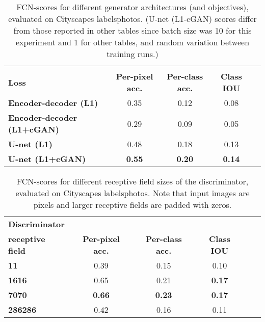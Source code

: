 \documentclass[10pt,twocolumn,letterpaper]{article}
\begin{document}
\begin{table}
\centering
\scalebox{0.75} {
\begin{tabular}{lcccc}
 & & & \\
\textbf{Loss} & \textbf{Per-pixel acc.} & \textbf{Per-class acc.} & \textbf{Class IOU} \\ \hline
\textbf{Encoder-decoder (L1)} & 0.35 & 0.12 & 0.08 \\
\textbf{Encoder-decoder (L1+cGAN)} & 0.29 & 0.09 & 0.05 \\
\textbf{U-net (L1)} & 0.48 & 0.18 & 0.13 \\
\textbf{U-net (L1+cGAN)} & \textbf{0.55} & \textbf{0.20} & \textbf{0.14} \\
\end{tabular} }
\vspace{-0.1in}
\caption {FCN-scores for different generator architectures (and objectives), evaluated on Cityscapes labelsphotos. (U-net (L1-cGAN) scores differ from those reported in other tables since batch size was 10 for this experiment and 1 for other tables, and random variation between training runs.)}
\label{tab:arch_variations}
\vspace{-0.1in}
\end{table}

\begin{table}
\centering
\scalebox{0.75} {
\begin{tabular}{lccccc}
\textbf{Discriminator} & & & \\
\textbf{receptive field} & \textbf{Per-pixel acc.} & \textbf{Per-class acc.} & \textbf{Class IOU} \\ \hline
\textbf{11} & 0.39 & 0.15 & 0.10 \\
\textbf{1616} & 0.65 & 0.21 & \textbf{0.17}  \\
\textbf{7070} & \textbf{0.66} & \textbf{0.23} & \textbf{0.17}  \\
\textbf{286286} & 0.42 & 0.16 & 0.11 \\
\end{tabular} }
\vspace{-0.1in}
\caption {FCN-scores for different receptive field sizes of the discriminator, evaluated on Cityscapes labelsphotos. Note that input images are  pixels and larger receptive fields are padded with zeros.}
\vspace{-0.2in}
\label{tab:patchsize_variations}
\end{table}
\end{document}

